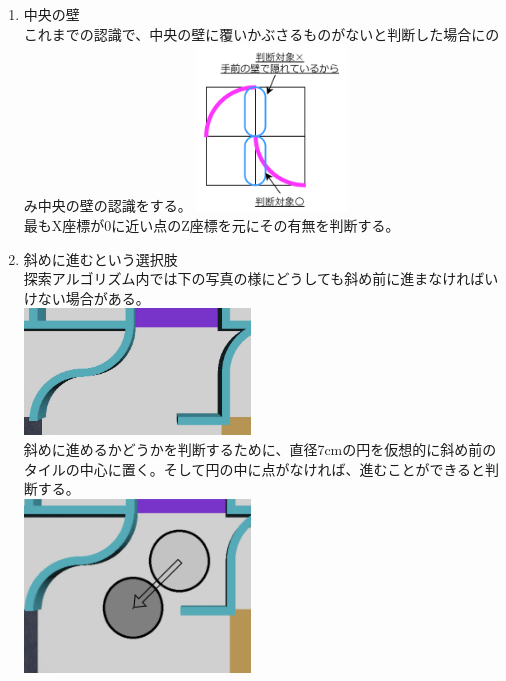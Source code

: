 \documentclass[dvipdfmx,a4paper]{jsarticle}
\begin{document}
\begin{enumerate}
      \item 中央の壁\\
        これまでの認識で、中央の壁に覆いかぶさるものがないと判断した場合にのみ中央の壁の認識をする。
        \includegraphics[width=40mm]{Photo/LiDAR/14.png}\\
        最もX座標が0に近い点のZ座標を元にその有無を判断する。
      \item 斜めに進むという選択肢\\
        探索アルゴリズム内では下の写真の様にどうしても斜め前に進まなければいけない場合がある。\\
        \includegraphics[width=60mm]{Photo/LiDAR/15.png}\\
        斜めに進めるかどうかを判断するために、直径7cmの円を仮想的に斜め前のタイルの中心に置く。そして円の中に点がなければ、進むことができると判断する。\\
        \includegraphics[width=60mm]{Photo/LiDAR/16.png}
    \end{enumerate}
\end{document}
